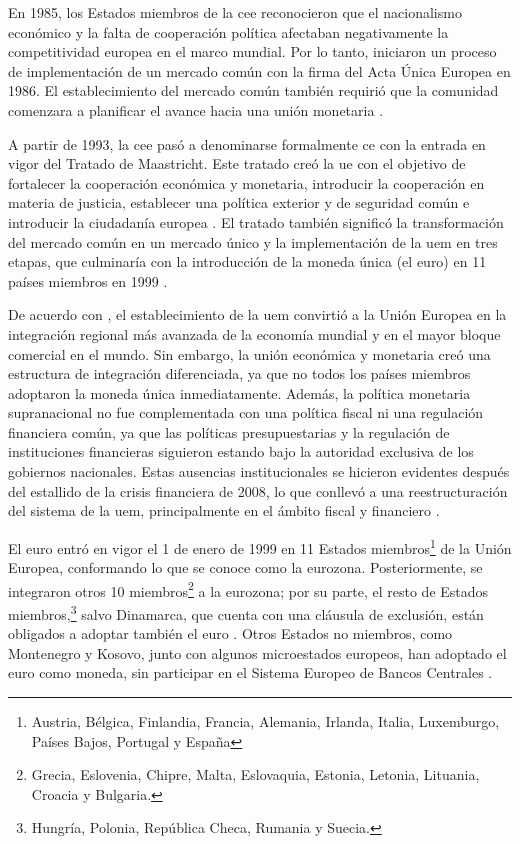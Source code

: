 En 1985, los Estados miembros de la \gls{cee} reconocieron que el nacionalismo económico y la falta de cooperación política afectaban negativamente la competitividad europea en el marco mundial. Por lo tanto, iniciaron un proceso de implementación de un mercado común con la firma del Acta Única Europea en 1986. El establecimiento del mercado común también requirió que la comunidad comenzara a planificar el avance hacia una unión monetaria \parencite[p.~49]{Kollarik2025}.

A partir de 1993, la \gls{cee} pasó a denominarse formalmente \gls{ce} con la entrada en vigor del Tratado de Maastricht. Este tratado creó la \acrfull{ue} con el objetivo de fortalecer la cooperación económica y monetaria, introducir la cooperación en materia de justicia, establecer una política exterior y de seguridad común e introducir la ciudadanía europea \parencite[p.~563]{EuropaDirectory2022}. El tratado también significó la transformación del mercado común en un mercado único y la implementación de la \gls{uem} en tres etapas, que culminaría con la introducción de la moneda única (el euro) en 11 países miembros en 1999 \parencite[p.~598]{EuropaDirectory2022}. 

De acuerdo con \cite{Kollarik2025}, el establecimiento de la \gls{uem} convirtió a la Unión Europea en la integración regional más avanzada de la economía mundial y en el mayor bloque comercial en el mundo. Sin embargo, la unión económica y monetaria creó una estructura de integración diferenciada, ya que no todos los países miembros adoptaron la moneda única inmediatamente. Además, la política monetaria supranacional no fue complementada con una política fiscal ni una regulación financiera común, ya que las políticas presupuestarias y la regulación de instituciones financieras siguieron estando bajo la autoridad exclusiva de los gobiernos nacionales. Estas ausencias institucionales se hicieron evidentes después del estallido de la crisis financiera de 2008, lo que conllevó a una reestructuración del sistema de la \gls{uem}, principalmente en el ámbito fiscal y financiero \parencite[pp.~55--56]{Kollarik2025}.

El euro entró en vigor el 1 de enero de 1999 en 11 Estados miembros\footnote{Austria, Bélgica, Finlandia, Francia, Alemania, Irlanda, Italia, Luxemburgo, Países Bajos, Portugal y España} de la Unión Europea, conformando lo que se conoce como la eurozona. Posteriormente, se integraron otros 10 miembros\footnote{Grecia, Eslovenia, Chipre, Malta, Eslovaquia, Estonia, Letonia, Lituania, Croacia y Bulgaria.} a la eurozona; por su parte, el resto de Estados miembros,\footnote{Hungría, Polonia, República Checa, Rumania y Suecia.} salvo Dinamarca, que cuenta con una cláusula de exclusión, están obligados a adoptar también el euro \parencite[p.~51]{Kollarik2025}. Otros Estados no miembros, como Montenegro y Kosovo, junto con algunos microestados europeos, han adoptado el euro como moneda, sin participar en el Sistema Europeo de Bancos Centrales \parencite[p.~2]{Leuffen2022}.

